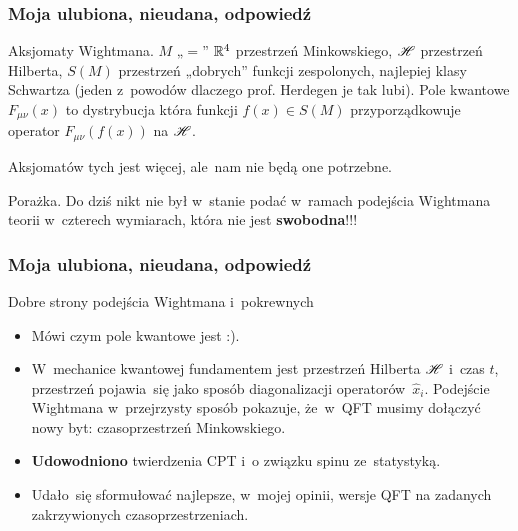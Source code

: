 \documentclass[10pt,t]{beamer}
\begin{document}
\begin{frame}
  \frametitle{Moja ulubiona, nieudana, odpowiedź}


  Aksjomaty Wightmana.
  $M$ „$=$” $\mathbb{R}^{ 4 }$ przestrzeń Minkowskiego, $\mathcal{H}$ przestrzeń
  Hilberta, $S( M )$ przestrzeń „dobrych” funkcji zespolonych, najlepiej
  klasy Schwartza (jeden z~powodów dlaczego prof. Herdegen je tak lubi).
  Pole kwantowe $F_{ \mu \nu }( x )$ to dystrybucja która funkcji
  $f( x ) \in S( M )$ przyporządkowuje operator $F_{ \mu \nu }( f( x ) )$ na
  $\mathcal{H}$.

  Aksjomatów tych jest więcej, ale~nam nie będą one potrzebne.

  { \color{red} Porażka. }
  Do dziś nikt nie był w~stanie podać w~ramach podejścia Wightmana
  teorii w~czterech wymiarach, która nie jest \textbf{swobodna}!!!

\end{frame}





\begin{frame}
  \frametitle{Moja ulubiona, nieudana, odpowiedź}


  Dobre strony podejścia Wightmana i~pokrewnych
  \begin{itemize}

  \item Mówi czym pole kwantowe jest :).

  \item W~mechanice kwantowej fundamentem jest przestrzeń
    Hilberta $\mathcal{H}$ i~czas $t$, przestrzeń pojawia~się jako
    sposób diagonalizacji operatorów~$\widehat{x}_{ i }$. Podejście
    Wightmana w~przejrzysty sposób pokazuje, że~w~QFT musimy
    dołączyć nowy byt: czasoprzestrzeń Minkowskiego.

  \item \textbf{Udowodniono} twierdzenia CPT i~o związku spinu ze~statystyką.

  \item Udało~się sformułować najlepsze, w~mojej opinii, wersje
    QFT na zadanych zakrzywionych czasoprzestrzeniach.

  \end{itemize}

\end{frame}
\end{document}
